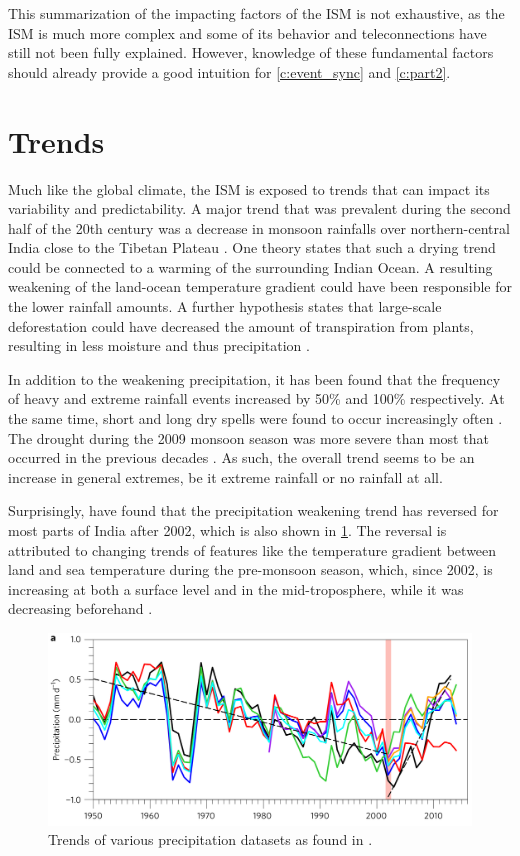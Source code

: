This summarization of the impacting factors of the ISM is not exhaustive, as the ISM is much more complex and some of its behavior and teleconnections have still not been fully explained. However, knowledge of these fundamental factors should already provide a good intuition for \cref{c:event_sync} and \cref{c:part2}.


\section{Trends}
\label{st:ism_trends}
Much like the global climate, the ISM is exposed to trends that can impact its variability and predictability. A major trend that was prevalent during the second half of the 20th century was a decrease in monsoon rainfalls over northern-central India close to the Tibetan Plateau \citep{Jin.2017}. One theory states that such a drying trend could be connected to a warming of the surrounding Indian Ocean. A resulting weakening of the land-ocean temperature gradient could have been responsible for the lower rainfall amounts. A further hypothesis states that large-scale deforestation could have decreased the amount of transpiration from plants, resulting in less moisture and thus precipitation \citep{Jin.2017}.

In addition to the weakening precipitation, it has been found that the frequency of heavy and extreme rainfall events increased by 50\% and 100\% respectively. At the same time, short and long dry spells were found to occur increasingly often \citep{Auffhammer.2012}. The drought during the 2009 monsoon season was more severe than most that occurred in the previous decades \citep{Auffhammer.2012}. As such, the overall trend seems to be an increase in general extremes, be it extreme rainfall or no rainfall at all.

Surprisingly, \citet{Jin.2017} have found that the precipitation weakening trend has reversed for most parts of India after 2002, which is also shown in \cref{fig:precipitation_trend}. The reversal is attributed to changing trends of features like the temperature gradient between land and sea temperature during the pre-monsoon season, which, since 2002, is increasing at both a surface level and in the mid-troposphere, while it was decreasing beforehand \citep{Jin.2017}.

\begin{figure}[h]
  \centering
  \includegraphics[width=0.7\linewidth]{./99_appendix/img/precipitation_trend}
  \caption{Trends of various precipitation datasets as found in \citet{Jin.2017}.}
  \label{fig:precipitation_trend}
\end{figure}


